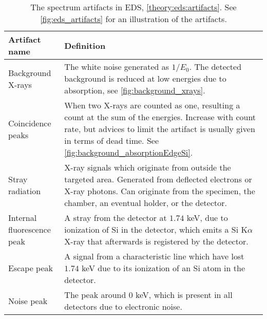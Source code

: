 \begin{table}[hbtp]
    \begin{center}
        \caption{
            The spectrum artifacts in EDS, \cref{theory:eds:artifacts}.
            See \cref{fig:eds_artifacts} for an illustration of the artifacts.
        }
        \renewcommand*{\arraystretch}{1.4}
        \label{tab:eds_artifacts}
        \begin{tabular}{p{4cm}p{10.6cm}}
            \hline
            \textbf{Artifact name}     & \textbf{Definition}                                                                                                                                                                                                                   \\
            \hline
            Background X-rays          & The white noise generated as $1/E_0$. The detected background is reduced at low energies due to absorption, see \cref{fig:background_xrays}.                                                                                          \\
            Coincidence peaks          & When two X-rays are counted as one, resulting a count at the sum of the energies. Increase with count rate, but advices to limit the artifact is usually given in terms of dead time. See \cref{fig:background_absorptionEdgeSi}. \\
            Stray radiation            & X-ray signals which originate from outside the targeted area. Generated from deflected electrons or X-ray photons. Can originate from the specimen, the chamber, an eventual holder, or the detector.                                 \\
            Internal fluorescence peak & A stray from the detector at $1.74$ keV, due to ionization of Si in the detector, which emits a Si K$\alpha$ X-ray that afterwards is registered by the detector.                                                                       \\
            Escape peak                & A signal from a characteristic line which have lost $1.74$ keV due to its ionization of an Si atom in the detector.                                                                                                                     \\
            Noise peak                 & The peak around $0$ keV, which is present in all detectors due to electronic noise.                                                                                                                                                     \\
            \hline
        \end{tabular}
    \end{center}
\end{table}